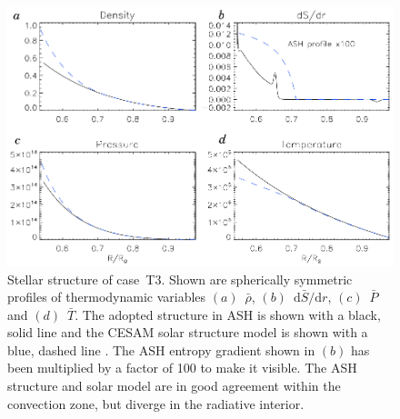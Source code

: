 \begin{figure}[!t]
  \begin{center}
    \includegraphics{figs/chapter_9/mhd_tacho_3_structure.eps}
  \end{center}
  \caption[Stellar structure of case~T3]
          {Stellar structure of case~T3.  Shown are spherically
            symmetric profiles of thermodynamic variables 
            $(a)$~$\bar{\rho}$, $(b)$~$\mathrm{d}\bar{S}/\mathrm{d}r$,
            $(c)$~$\bar{P}$ and $(d)$~$\bar{T}$.   
            The adopted structure in ASH is shown with a black, solid
            line and the CESAM solar structure model is shown with a
            blue, dashed line \citep[from][]{Brun_et_al_2002}.  The
            ASH entropy gradient shown in $(b)$ has been multiplied by
            a factor of 100 to make it visible.  The
            ASH structure and solar model are in good agreement within
            the convection zone, but diverge in the radiative
            interior.
            \label{fig:T3 structure}}
\end{figure}

